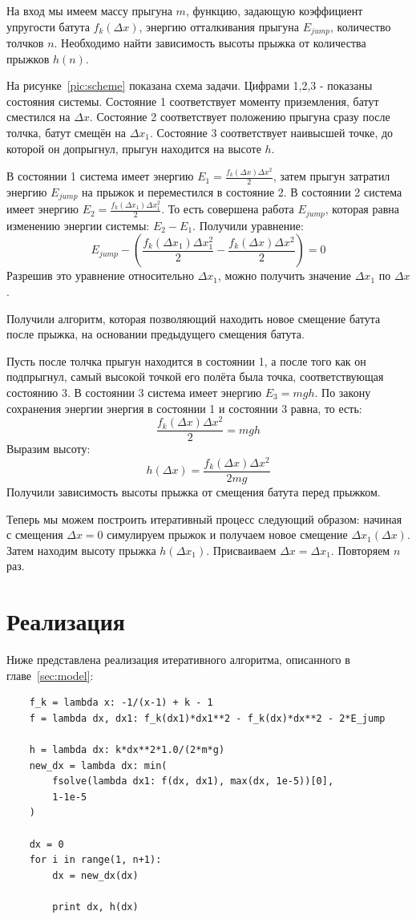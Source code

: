 \documentclass[12pt,a4paper,oneside]{extarticle}
\begin{document}
    На вход мы имеем массу прыгуна $m$, функцию, задающую коэффициент упругости батута $f_k(\Delta x)$, энергию отталкивания прыгуна $E_{jump}$, количество толчков $n$. Необходимо найти зависимость высоты прыжка от количества прыжков $h(n)$.

    На рисунке~\ref{pic:scheme} показана схема задачи. Цифрами 1,2,3 - показаны состояния системы. Состояние 1 соответствует моменту приземления, батут сместился на $\Delta x$. Состояние 2 соответствует положению прыгуна сразу после толчка, батут смещён на $\Delta x_1$. Состояние 3 соответствует наивысшей точке, до которой он допрыгнул, прыгун находится на высоте $h$.

    В состоянии 1 система имеет энергию $E_1=\frac{f_k(\Delta x) \Delta x^2}{2}$, затем прыгун затратил энергию $E_{jump}$ на прыжок и переместился в состояние 2. В состоянии 2 система имеет энергию $E_2=\frac{f_k(\Delta x_1) \Delta x_1^2}{2}$.
    То есть совершена работа $E_{jump}$, которая равна изменению энергии системы: $E_2-E_1$. Получили уравнение:
    $$E_{jump} - (\frac{f_k(\Delta x_1) \Delta x_1^2}{2} - \frac{f_k(\Delta x)\Delta x^2}{2}) = 0$$
    Разрешив это уравнение относительно $\Delta x_1$, можно получить значение $\Delta x_1$ по $\Delta x$.
    
    Получили алгоритм, которая позволяющий находить новое смещение батута после прыжка, на основании предыдущего смещения батута.

    Пусть после толчка прыгун находится в состоянии 1, а после того как он подпрыгнул, самый высокой точкой его полёта была точка, соответствующая состоянию 3. В состоянии 3 система имеет энергию $E_3=mgh$. По закону сохранения энергии энергия в состоянии 1 и состоянии 3 равна, то есть:
    $$\frac{f_k(\Delta x) \Delta x^2}{2} = mgh$$
    Выразим высоту:
    $$h(\Delta x) = \frac{f_k(\Delta x)\Delta x^2}{2mg}$$
    Получили зависимость высоты прыжка от смещения батута перед прыжком.

    Теперь мы можем построить итеративный процесс следующий образом: начиная с смещения $\Delta x=0$ симулируем прыжок и получаем новое смещение $\Delta x_1(\Delta x)$. Затем находим высоту прыжка $h(\Delta x_1)$. Присваиваем $\Delta x = \Delta x_1$. Повторяем $n$ раз.
    
\section{Реализация}
    Ниже представлена реализация итеративного алгоритма, описанного в главе~\ref{sec:model}:
    \begin{lstlisting}
    f_k = lambda x: -1/(x-1) + k - 1
    f = lambda dx, dx1: f_k(dx1)*dx1**2 - f_k(dx)*dx**2 - 2*E_jump

    h = lambda dx: k*dx**2*1.0/(2*m*g)
    new_dx = lambda dx: min(
        fsolve(lambda dx1: f(dx, dx1), max(dx, 1e-5))[0],
        1-1e-5
    )

    dx = 0
    for i in range(1, n+1):
        dx = new_dx(dx)

        print dx, h(dx)
    \end{lstlisting}
\end{document}

